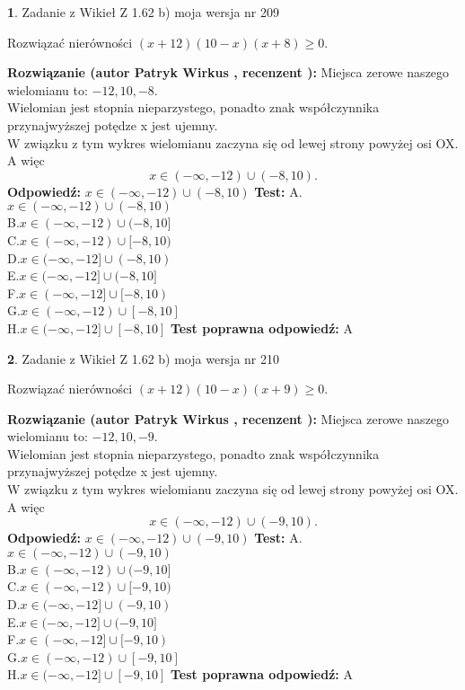 \documentclass[12pt, a4paper]{article}
\theoremstyle{definition} %
\newtheorem{zad}{}
\newcommand{\zadStart}[1]{\begin{zad}#1\newline}
\newcommand{\zadStop}{\end{zad}}
\newcommand{\rozwStart}[2]{\noindent \textbf{Rozwiązanie (autor #1 , recenzent #2): }\newline}
\newcommand{\rozwStop}{\newline}
\newcommand{\odpStart}{\noindent \textbf{Odpowiedź:}\newline}
\newcommand{\odpStop}{\newline}
\newcommand{\testStart}{\noindent \textbf{Test:}\newline}
\newcommand{\testStop}{\newline}
\newcommand{\kluczStart}{\noindent \textbf{Test poprawna odpowiedź:}\newline}
\newcommand{\kluczStop}{\newline}
\begin{document}
\zadStart{Zadanie z Wikieł Z 1.62 b) moja wersja nr 209}

Rozwiązać nierówności $(x+12)(10-x)(x+8)\ge0$.
\zadStop
\rozwStart{Patryk Wirkus}{}
Miejsca zerowe naszego wielomianu to: $-12, 10, -8$.\\
Wielomian jest stopnia nieparzystego, ponadto znak współczynnika przy\linebreak najwyższej potędze x jest ujemny.\\ W związku z tym wykres wielomianu zaczyna się od lewej strony powyżej osi OX. A więc $$x \in (-\infty,-12) \cup (-8,10).$$
\rozwStop
\odpStart
$x \in (-\infty,-12) \cup (-8,10)$
\odpStop
\testStart
A.$x \in (-\infty,-12) \cup (-8,10)$\\
B.$x \in (-\infty,-12) \cup (-8,10]$\\
C.$x \in (-\infty,-12) \cup [-8,10)$\\
D.$x \in (-\infty,-12] \cup (-8,10)$\\
E.$x \in (-\infty,-12] \cup (-8,10]$\\
F.$x \in (-\infty,-12] \cup [-8,10)$\\
G.$x \in (-\infty,-12) \cup [-8,10]$\\
H.$x \in (-\infty,-12] \cup [-8,10]$
\testStop
\kluczStart
A
\kluczStop



\zadStart{Zadanie z Wikieł Z 1.62 b) moja wersja nr 210}

Rozwiązać nierówności $(x+12)(10-x)(x+9)\ge0$.
\zadStop
\rozwStart{Patryk Wirkus}{}
Miejsca zerowe naszego wielomianu to: $-12, 10, -9$.\\
Wielomian jest stopnia nieparzystego, ponadto znak współczynnika przy\linebreak najwyższej potędze x jest ujemny.\\ W związku z tym wykres wielomianu zaczyna się od lewej strony powyżej osi OX. A więc $$x \in (-\infty,-12) \cup (-9,10).$$
\rozwStop
\odpStart
$x \in (-\infty,-12) \cup (-9,10)$
\odpStop
\testStart
A.$x \in (-\infty,-12) \cup (-9,10)$\\
B.$x \in (-\infty,-12) \cup (-9,10]$\\
C.$x \in (-\infty,-12) \cup [-9,10)$\\
D.$x \in (-\infty,-12] \cup (-9,10)$\\
E.$x \in (-\infty,-12] \cup (-9,10]$\\
F.$x \in (-\infty,-12] \cup [-9,10)$\\
G.$x \in (-\infty,-12) \cup [-9,10]$\\
H.$x \in (-\infty,-12] \cup [-9,10]$
\testStop
\kluczStart
A
\kluczStop
\end{document}
